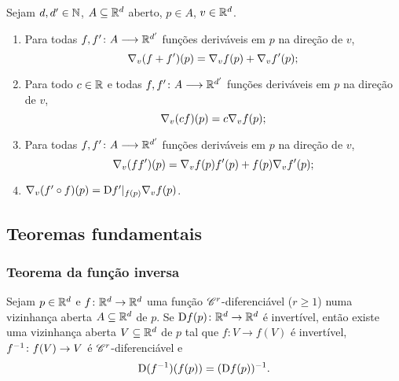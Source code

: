 \begin{exercise}
Sejam $d,d' \in \mathbb{N}$, $A \subseteq \mathbb{R}^d$ aberto, $p \in A$, $v \in \mathbb{R}^d$.
\begin{enumerate}
	\item Para todas ${f,f'}\colon {A} \longrightarrow {\mathbb{R}^{d'}}$ funções deriváveis em $p$ na direção de $v$,
		\begin{equation*}
		\nabla_v(f+f')(p) = \nabla_v f(p) + \nabla_v f'(p);
		\end{equation*}
	\item Para todo $c \in \mathbb{R}$ e todas ${f,f'}\colon {A} \longrightarrow {\mathbb{R}^{d'}}$ funções deriváveis em $p$ na direção de $v$,
		\begin{equation*}
		\nabla_v(cf)(p) = c\nabla_v f(p);
		\end{equation*}
	\item Para todas ${f,f'}\colon {A} \longrightarrow {\mathbb{R}^{d'}}$ funções deriváveis em $p$ na direção de $v$,
		\begin{equation*}
		\nabla_v(ff')(p) = \nabla_vf(p)f'(p) + f(p)\nabla_v f'(p);
		\end{equation*}
	\item $\nabla_v(f' \circ f)(p) = \mathrm{D} f'|_{f(p)} \nabla_v f(p)$.
\end{enumerate}
\end{exercise}

\subsection{Teoremas fundamentais}

\subsubsection{Teorema da função inversa}

\begin{proposition}

Sejam $p \in \mathbb{R}^d$ e $f\colon \mathbb{R}^d \to \mathbb{R}^d$ uma função $\mathscr{C}^r$-diferenciável ($r \geq 1$) numa vizinhança aberta $A \subseteq \mathbb{R}^d$ de $p$. Se $\mathrm{D} f(p)\colon \mathbb{R}^d \to \mathbb{R}^d$ é invertível, então existe uma vizinhança aberta $V \subseteq \mathbb{R}^d$ de $p$ tal que $f\colon V \to f(V)$ é invertível, $f^{-1}\colon f(V) \to V$ é $\mathscr{C}^r$-diferenciável e
	\begin{equation*}
	\mathrm{D}(f^{-1})(f(p)) = (\mathrm{D} f(p))^{-1}.
	\end{equation*}
\end{proposition}

